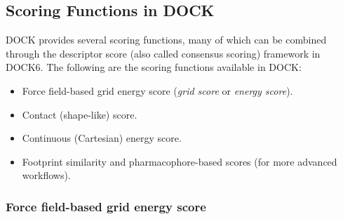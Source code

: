 \documentclass[12pt]{article}
\begin{document}
\subsection{Scoring Functions in DOCK}

DOCK provides several scoring functions, many of which can be combined through the descriptor score (also called consensus scoring) framework in DOCK6\cite{CH7_Allen2015}. 
The following are the scoring functions available in DOCK:
\begin{itemize}
  \item Force field-based grid energy score (\emph{grid score} or \emph{energy score}).
  \item Contact (shape-like) score.
  \item Continuous (Cartesian) energy score.
  \item Footprint similarity and pharmacophore-based scores (for more advanced workflows).
\end{itemize}

\subsubsection{Force field-based grid energy score}
\end{document}
